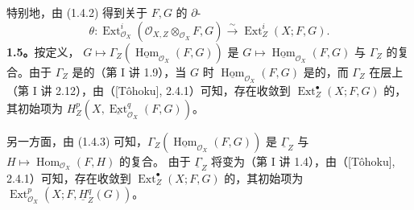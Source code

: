 特别地，由 (1.4.2) 得到关于 $F,G$ 的 $\partial$-
\[
\theta:\operatorname{Ext}^i_{\mathscr O_X}(\mathscr O_{X,Z}\otimes_{\mathscr O_X}F,G)
\xrightarrow{\sim}\operatorname{Ext}^i_Z(X;F,G).
\]
\textbf{1.5。}按定义， $G\mapsto\Gamma_Z(\underline{\operatorname{Hom}}_{\mathscr O_X}(F,G))$ 是 $G\mapsto\underline{\operatorname{Hom}}_{\mathscr O_X}(F,G)$ 与 $\Gamma_Z$ 的复合。由于 $\Gamma_Z$ 是的（第 I 讲 1.9），当 $G$ 时 $\underline{\operatorname{Hom}}_{\mathscr O_X}(F,G)$ 是的，而 $\Gamma_Z$ 在层上（第 I 讲 2.12），由（[Tôhoku], 2.4.1）可知，存在收敛到 $\operatorname{Ext}^{\bullet}_Z(X;F,G)$ 的，其初始项为 $H^p_Z(X,\underline{\operatorname{Ext}}^q_{\mathscr O_X}(F,G))$。

另一方面，由 (1.4.3) 可知，$\Gamma_Z(\underline{\operatorname{Hom}}_{\mathscr O_X}(F,G))$ 是 $\underline\Gamma_Z$ 与 $H\mapsto\operatorname{Hom}_{\mathscr O_X}(F,H)$ 的复合。
由于 $\underline\Gamma_Z$ 将变为（第 I 讲 1.4），由（[Tôhoku], 2.4.1）可知，存在收敛到 $\operatorname{Ext}^{\bullet}_Z(X;F,G)$ 的，其初始项为 $\operatorname{Ext}^p_{\mathscr O_X}(X;F,\underline H^q_Z(G))$。


